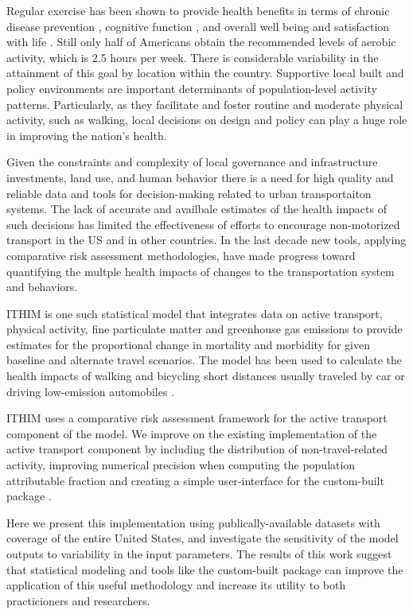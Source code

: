Regular exercise has been shown to provide health benefits in terms of
chronic disease prevention \cite{warburton2006}, cognitive function
\cite{hillman2008}, and overall well being and satisfaction with life
\cite{maher2013}. Still only half of Americans obtain the recommended
levels of aerobic activity, which is 2.5 hours per week. There is
considerable variability in the attainment of this goal by location
within the country. Supportive local built and policy environments are
important determinants of population-level activity
patterns. Particularly, as they facilitate and foster routine and moderate
physical activity, such as walking, local decisions on design and
policy can play a huge role in improving the nation's health.

Given the constraints and complexity of local governance and infrastructure investments, land use, and human behavior there is a need for high quality and reliable data and tools for decision-making related to urban transportaiton systems. The lack of accurate and availbale estimates of the health impacts of such decisions has limited the effectiveness of efforts to encourage non-motorized transport in the US and in other countries. In the last decade new tools, applying comparative risk assessment methodologies, have made progress toward quantifying the multple health impacts of changes to the transportation system and behaviors. 

ITHIM is one such statistical model that integrates data on active transport,
physical activity, fine particulate matter and greenhouse gas
emissions to provide estimates for the proportional change in
mortality and morbidity for given baseline and alternate travel
scenarios. The model has been used to calculate the health impacts of
walking and bicycling short distances usually traveled by car or
driving low-emission automobiles \cite{woodcock2013,maizlish2013}.

ITHIM uses a comparative risk assessment framework for the active
transport component of the model.  We improve on the existing
implementation of the active transport component by including the
distribution of non-travel-related activity, improving numerical
precision when computing the population attributable fraction and
creating a simple user-interface for the custom-built \R{}
package \package{}.

Here we present this implementation using publically-available datasets with coverage of the entire United States, and investigate the sensitivity of the model outputs to variability in the input parameters. The results of this work suggest that statistical modeling and tools like the custom-built \R{} package \package{} can improve the application of this useful methodology and increase its utility to both practicioners and researchers. 
